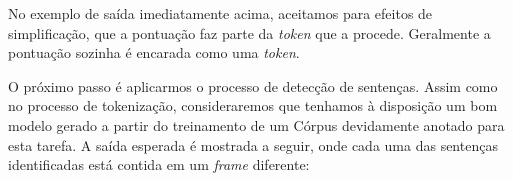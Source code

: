 \documentclass[11pt]{report}
\begin{document}
\begin{quote}
             
       
              
       
         
\end{quote}

No exemplo de saída imediatamente acima, aceitamos para efeitos de simplificação, que a pontuação faz parte da \textit{token} que a procede.
Geralmente a pontuação sozinha é encarada como uma \textit{token}.

O próximo passo é aplicarmos o processo de detecção de sentenças. Assim como no processo de tokenização, consideraremos que tenhamos à disposição um bom modelo
gerado a partir do treinamento de um Córpus devidamente anotado para esta tarefa. A saída esperada é mostrada a seguir, onde cada uma das sentenças identificadas está contida
em um \textit{frame} diferente:

\begin{quote}
\end{quote}

\begin{quote}
\end{quote}

\begin{quote}
\end{quote}
\end{document}

